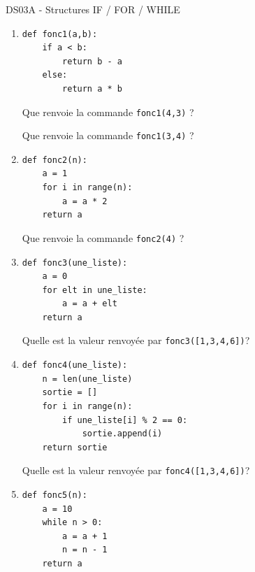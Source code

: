 \documentclass[a4paper,12pt,openany]{book}
\begin{document}
\begin{center}\begin{large}
DS03A - Structures IF / FOR / WHILE
\end{large}\end{center}



\begin{enumerate}
	\item 
	
	\begin{lstlisting}[numbers=none]
def fonc1(a,b):
    if a < b:
        return b - a
    else:
        return a * b
\end{lstlisting}
	
	Que renvoie la commande \verb+fonc1(4,3)+ ? \dotfill
	
	\medskip
	
		Que renvoie la commande \verb+fonc1(3,4)+ ? \dotfill

	\item 
	\begin{lstlisting}[numbers=none]
def fonc2(n):
    a = 1
    for i in range(n):
        a = a * 2
    return a
\end{lstlisting}
	
	Que renvoie la commande \verb+fonc2(4)+ ? \dotfill

	\medskip
	
	\item 
	\begin{lstlisting}[numbers=none]
def fonc3(une_liste):
    a = 0
    for elt in une_liste:
        a = a + elt
    return a
\end{lstlisting}
	
	Quelle est la valeur renvoyée par \verb+fonc3([1,3,4,6])+? \dotfill

	\medskip
	
	\item 
	\begin{lstlisting}[numbers=none]
def fonc4(une_liste):
    n = len(une_liste)
    sortie = []
    for i in range(n):
        if une_liste[i] % 2 == 0:
            sortie.append(i)
    return sortie
\end{lstlisting}
	
	Quelle est la valeur renvoyée par \verb+fonc4([1,3,4,6])+? \dotfill
	
	\medskip
	
	\item 
	\begin{lstlisting}[numbers=none]
def fonc5(n):
    a = 10
    while n > 0:
        a = a + 1
        n = n - 1
    return a
\end{lstlisting}
	

\end{enumerate}
\end{document}
